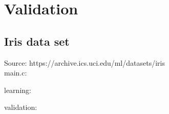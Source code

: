 \section{Validation}

\subsection{Iris data set}

Source: https://archive.ics.uci.edu/ml/datasets/iris \\

main.c:\\
\begin{scriptsize}
\begin{ttfamily}

\end{ttfamily}
\end{scriptsize}

learning:\\
\begin{scriptsize}
\begin{ttfamily}

\end{ttfamily}
\end{scriptsize}

validation:\\
\begin{scriptsize}
\begin{ttfamily}

\end{ttfamily}
\end{scriptsize}
